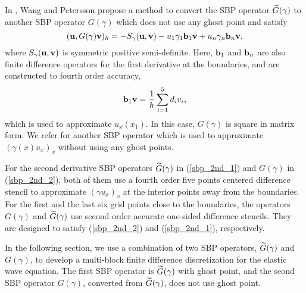  In \cite{wang2018fourth}, Wang and Petersson propose a method to convert the SBP operator $\widetilde{G}(\gamma)$ to another SBP operator $G(\gamma)$ which does not use any ghost point and satisfy
 \begin{equation}\label{sbp_2nd_2}
 ({\bf u}, G(\gamma){\bf v})_h = -S_\gamma({\bf u},{\bf v})-u_1\gamma_1{\bf b}_1{\bf v} + u_n\gamma_n{\bf b}_n{\bf v},
 \end{equation}
 where $S_\gamma({\bf u},{\bf v})$ is symmetric positive semi-definite. 
 Here, ${\bf b}_1$ and ${\bf b}_n$ are also finite difference operators for the first derivative at the boundaries, and are constructed to fourth order accuracy,
 \begin{equation}\label{sbp_1st_2}
 {\bf b}_1 {\bf v} = \frac{1}{h}\sum_{i=1}^{5} d_i v_i,
 \end{equation}
 which is used to approximate $u_x(x_1)$. In this case, ${G}(\gamma)$ is square in matrix form. We refer \cite{mattsson2004summation} for another SBP operator which is used to approximate $(\gamma(x)u_x)_x $ without using any ghost points.
 
For the second derivative SBP operators $\widetilde{G}(\gamma)$ in (\ref{sbp_2nd_1}) and $G(\gamma)$ in (\ref{sbp_2nd_2}), both of them use a fourth order five points centered difference stencil to approximate $(\gamma u_x)_x$ at the interior points away from the boundaries. For the first and the last six grid points close to the boundaries, the operators $G(\gamma)$ and $\widetilde{G}(\gamma)$ use second order accurate one-sided difference stencils. They are designed to satisfy (\ref{sbp_2nd_2}) and (\ref{sbp_2nd_1}), respectively.

In the following section, we use a combination of two SBP operators, $\widetilde{G}(\gamma)$ and $G(\gamma)$, to develop a multi-block finite difference discretization for the elastic wave equation. The first SBP operator is $\widetilde{G}(\gamma)$ with ghost point, and the seond SBP operator $G(\gamma)$, converted from $\widetilde{G}(\gamma)$, does not use ghost point.
